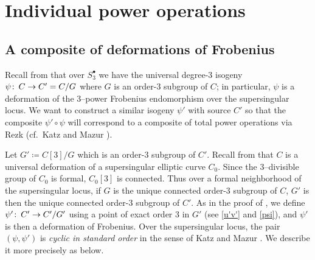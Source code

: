 \documentclass[microtype]{gtpart}     %
\theoremstyle{remark}
\theoremstyle{definition}
\def\co{\colon\thinspace}
\newcommand{\ce}{\coloneqq}
\newcommand{\s}{S^\bullet}
\begin{document}
\section{Individual power operations}
\label{sec:individual}

\subsection{A composite of deformations of Frobenius}

Recall from  that over $\s_3$ we have the universal 
degree-3 isogeny $\psi \co C \to C' = C/G$ where $G$ is an order-3 subgroup 
of $C$; in particular, $\psi$ is a deformation of the 3--power Frobenius 
endomorphism over the supersingular locus.  We want to construct a similar 
isogeny $\psi'$ with source $C'$ so that the composite $\psi' \circ \psi$ 
will correspond to a composite of total power operations via Rezk 
\cite[Theorem B]{cong} (cf.~Katz and Mazur \cite[11.3.1]{KM}).  

Let $G' \ce C[3]/G$ which is an order-3 subgroup of $C'$.  Recall from 
 that $C$ is a universal deformation of a supersingular 
elliptic curve $C_0$.  Since the 3--divisible group of $C_0$ is formal, 
$C_0[3]$ is connected.  Thus over a formal neighborhood of the supersingular 
locus, if $G$ is the unique connected order-3 subgroup of $C$, $G'$ is then 
the unique connected order-3 subgroup of $C'$.  As in the proof of 
, we define $\psi' \co C' \to C'/G'$ using a point of 
exact order 3 in $G'$ (see \eqref{u'v'} and \eqref{psi}), and $\psi'$ is then 
a deformation of Frobenius.  Over the supersingular locus, the pair 
$(\psi, \psi')$ is {\em cyclic in standard order} in the sense of Katz and 
Mazur \cite[6.7.7]{KM}.  We describe it more precisely as below.  
\end{document}
